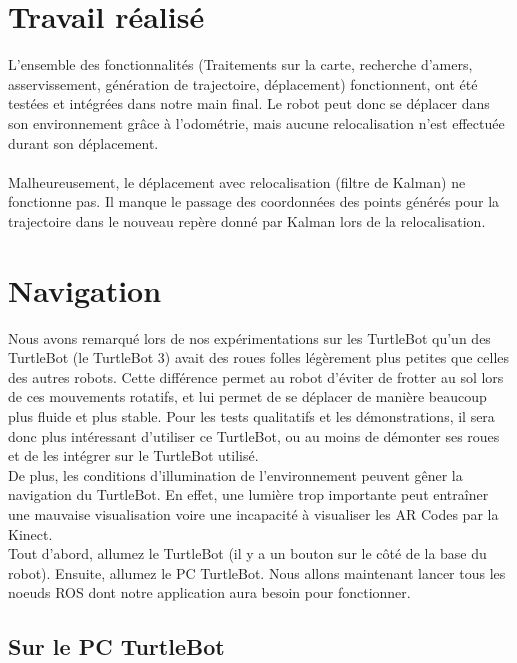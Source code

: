 \documentclass[10pt,a4paper]{article}
\begin{document}
\section{Travail réalisé}

L'ensemble des fonctionnalités (Traitements sur la carte, recherche d'amers, asservissement, génération de trajectoire, déplacement) fonctionnent, ont été testées et intégrées dans notre main final. Le robot peut donc se déplacer dans son environnement grâce à l'odométrie, mais aucune relocalisation n'est effectuée durant son déplacement.\\\\
Malheureusement, le déplacement avec relocalisation (filtre de Kalman) ne fonctionne pas. Il manque le passage des coordonnées des points générés pour la trajectoire dans le nouveau repère donné par Kalman lors de la relocalisation.



\newpage
\section{Navigation}
\label{sec:Navigation}


Nous avons remarqué lors de nos expérimentations sur les TurtleBot qu'un des TurtleBot (le TurtleBot 3) avait des roues folles légèrement plus petites que celles des autres robots. Cette différence permet au robot d'éviter de frotter au sol lors de ces mouvements rotatifs, et lui permet de se déplacer de manière beaucoup plus fluide et plus stable. Pour les tests qualitatifs et les démonstrations, il sera donc plus intéressant d'utiliser ce TurtleBot, ou au moins de démonter ses roues et de les intégrer sur le TurtleBot utilisé.\\

De plus, les conditions d'illumination de l'environnement peuvent gêner la navigation du TurtleBot. En effet, une lumière trop importante peut entraîner une mauvaise visualisation voire une incapacité à visualiser les AR Codes par la Kinect. \\

Tout d'abord, allumez le TurtleBot (il y a un bouton sur le côté de la base du robot). Ensuite, allumez le PC TurtleBot. Nous allons maintenant lancer tous les noeuds ROS dont notre application aura besoin pour fonctionner.

\subsection{Sur le PC TurtleBot}
\end{document}
